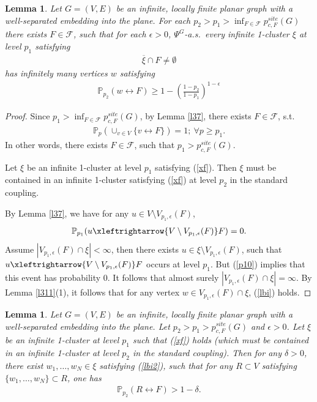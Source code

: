 \documentclass[11pt]{amsart}
\theoremstyle{plain}
\newtheorem{lemma}[theorem]{Lemma}
\numberwithin{equation}{section}
\numberwithin{figure}{section}
\newcommand\ol{\overline}
\newcommand\PP{{\mathbb P}}
\begin{document}
\begin{lemma}\label{l74}Let $G=(V,E)$ be an infinite, locally finite planar graph with a well-separated embedding into the plane. For each $p_2>p_1>\inf_{F\in\mathcal{F}}p_{c,F}^{site}(G)$  there exists $F\in\mathcal{F}$, such that for each $\epsilon>0$, $\Psi^{G}$-a.s.~every infinite 1-cluster $\xi$ at level $p_1$ satisfying
\begin{align}
\ol{\xi}\cap F\neq \emptyset\label{xf}
\end{align}
has infinitely many vertices $w$ satisfying
\begin{align}
\mathbb{P}_{p_2}(w\leftrightarrow F)\geq 1-\left(\frac{1-p_2}{1-p_1}\right)^{1-\epsilon}\label{lbi}
\end{align}
\end{lemma}

\begin{proof}Since $p_1>\inf_{F\in\mathcal{F}}p_{c,F}^{site}(G)$, by Lemma \ref{l37}, there exists $F\in \mathcal{F}$, s.t.
\begin{align*}
\PP_p(\cup_{v\in V}\{v\leftrightarrow F\})=1;\ \forall p\geq p_1.
\end{align*}
In other words, there exists $F\in \mathcal{F}$, such that $p_1>p_{c,F}^{site}(G)$.

Let $\xi$ be an infinite 1-cluster at level $p_1$ satisfying (\ref{xf}). Then $\xi$ must be  contained in an infinite 1-cluster satisfying (\ref{xf}) at level $p_2$ in the standard coupling.





By Lemma \ref{l37}, we have for any $u\in V\setminus V_{p_1,\epsilon}(F)$,
\begin{align*}
\PP_{p_1}(u\xleftrightarrow{V\setminus V_{p_1,\epsilon}(F)} F)=0.
\end{align*}
Assume $|V_{p_1,\epsilon}(F)\cap \xi|<\infty$, then there exists $u\in \xi\setminus V_{p_1,\epsilon}(F)$, such that $u\xleftrightarrow{V\setminus V_{p_1,\epsilon}(F)}F$ occurs at level $p_1$. But (\ref{p10}) implies that this event has probability 0. It follows that almost surely $|V_{p_1,\epsilon}(F)\cap \xi|=\infty$. By Lemma \ref{l311}(1), it follows that for any vertex $w\in V_{p_1,\epsilon}(F)\cap \xi$, (\ref{lbi}) holds.
\end{proof}

\begin{lemma}\label{lem316}Let $G=(V,E)$ be an infinite, locally finite planar graph with a well-separated embedding into the plane. Let $p_2>p_1>p_{c,F}^{site}(G)$ and $\epsilon>0$. Let $\xi$ be an infinite 1-cluster at level $p_1$ such that (\ref{xf}) holds (which must be contained in an infinite 1-cluster at level $p_2$ in the standard coupling). Then for any $\delta>0$, there exist $w_1,\ldots,w_N\in \xi$ satisfying (\ref{lbi2}), such that for any $R\subset V$ satisfying $\{w_1,\ldots,w_N\}\subset R$, one  has
\begin{align*}
\mathbb{P}_{p_2}(R\leftrightarrow F)>1-\delta.
\end{align*}
\end{lemma}
\end{document}
